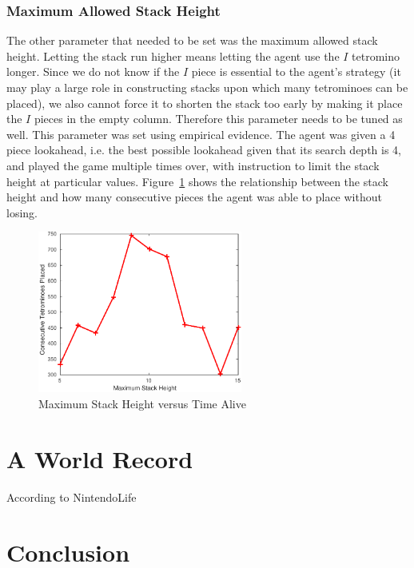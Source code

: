 \documentclass[fontsize=12pt]{article}
\begin{document}
\subsubsection{Maximum Allowed Stack Height}
\label{ssub:maximum_allowed_stack_height}
\par The other parameter that needed to be set was the maximum allowed stack height. Letting the stack run higher means letting the agent use the $I$ tetromino longer. Since we do not know if the $I$ piece is essential to the agent's strategy (it may play a large role in constructing stacks upon which many tetrominoes can be placed), we also cannot force it to shorten the stack too early by making it place the $I$ pieces in the empty column. Therefore this parameter needs to be tuned as well. This parameter was set using empirical evidence. The agent was given a 4 piece lookahead, i.e. the best possible lookahead given that its search depth is 4, and played the game multiple times over, with instruction to limit the stack height at particular values. Figure~\ref{fig:maximum_stack_height_vs_time_alive} shows the relationship between the stack height and how many consecutive pieces the agent was able to place without losing.

\begin{figure}[H]
  \centering
  \includegraphics[width=0.6\textwidth]{figures/height_v_time_d4}
  \caption{Maximum Stack Height versus Time Alive}
  \label{fig:maximum_stack_height_vs_time_alive}
\end{figure}

\section{A World Record}
\label{sec:a_world_record}
According to NintendoLife

\section{Conclusion}
\label{sec:conclusion}
\end{document}
